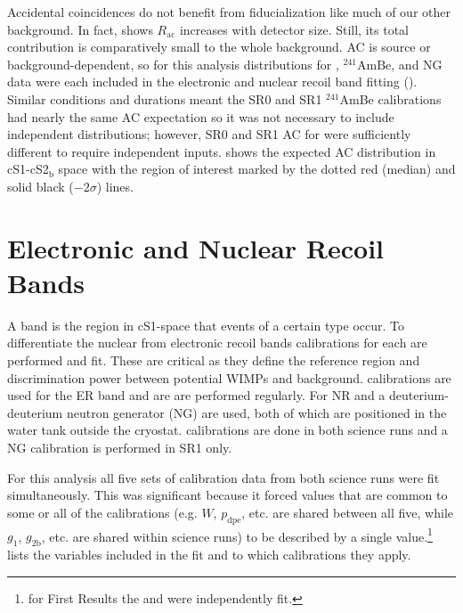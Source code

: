 Accidental coincidences do not benefit from fiducialization like much of our other background.  In fact,
 shows $R_{\mathrm{ac}}$ increases
with detector size.  Still, its total contribution is comparatively small to the whole background.  AC is source or background-dependent,
so for this analysis
distributions for , $\mathrm{^{241}AmBe}$, and NG data were each included in the electronic and nuclear recoil band fitting
().  Similar conditions and durations meant the SR0 and SR1 $^{241}$AmBe calibrations had nearly the same
AC expectation so it was not
necessary to include independent distributions; however, SR0 and SR1 AC for  were sufficiently different to require
independent inputs.   shows the expected AC distribution in cS1-cS2$_{\mathrm{b}}$
space with the region of interest marked by the dotted red (median) and solid black ($-2 \sigma$) lines.




\section{Electronic and Nuclear Recoil Bands}
\label{sec:er_nr_calibrations}
A band is the region in cS1-\cstwob space that events of a certain type occur.  To
differentiate the nuclear from electronic recoil bands calibrations for each are performed and fit.  These are critical as
they define the reference region and discrimination power between potential WIMPs and background.   calibrations are used for
the ER band and are are performed regularly.  For NR  and a deuterium-deuterium
neutron generator (NG) are used, both of which are positioned in the water tank outside the cryostat.  \ambe calibrations are done in
both science runs and a NG calibration is performed in SR1 only.

For this analysis all five sets of calibration data from both science runs were fit simultaneously.  This was
significant because it forced values that are common to some or all of the calibrations (e.g. $W$, $p_{\mathrm{dpe}}$, etc. are shared
between all five, while $g_1$, $g_{2\mathrm{b}}$, etc. are shared within science runs) to be described by a single
value.\footnote{for First Results
the \radoncal and \ambe were independently fit.}   lists the variables included in the fit and
to which calibrations they apply.



